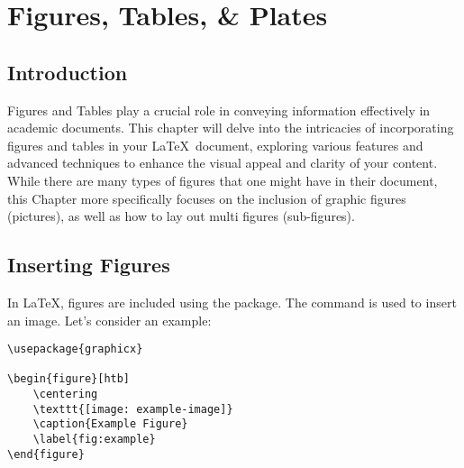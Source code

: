 \chapter{Figures, Tables, \& Plates}\label{ch:figureandtables}
	\section{Introduction}
		Figures and Tables play a crucial role in conveying information effectively in academic documents. 
		This chapter will delve into the intricacies of incorporating figures and tables in your \LaTeX\ document, exploring various features and advanced techniques to enhance the visual appeal and clarity of your content.
		While there are many types of figures that one might have in their document, this Chapter more specifically focuses on the inclusion of graphic figures (pictures), as well as how to lay out multi figures (sub-figures).



	\section{Inserting Figures}
		In \LaTeX, figures are included using the  package. 
		The  command is used to insert an image. 
		Let's consider an example:

		\begin{lstlisting}[float=ht,caption=A Basic Example of Including a Figure.,label=lst:figureExample,style=LaTeXStyle,basicstyle=\small\ttfamily,]
\usepackage{graphicx}

\begin{figure}[htb]
	\centering
	\texttt{[image: example-image]}
	\caption{Example Figure}
	\label{fig:example}
\end{figure}
		\end{lstlisting}

